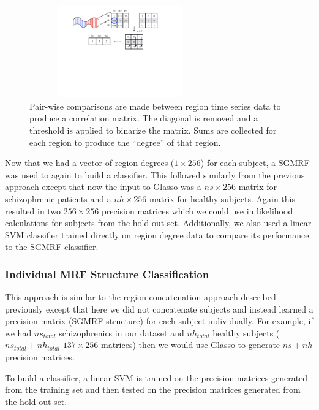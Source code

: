 \documentclass{article} %
\begin{document}
\begin{figure}[!htb]
  \centering
  \includegraphics[width=0.7\textwidth, height=4.0cm]{diagrams/ROI_deg_img.pdf}
  \caption{Pair-wise comparisons are made between region time series data to
  produce a correlation matrix. The diagonal is removed and a threshold is
  applied to binarize the matrix. Sums are collected for each region to
  produce the ``degree'' of that region.}
  \label{fig:degree_calc}
\end{figure}

Now that we had a vector of region degrees ($1 \times 256$) for each subject,
a SGMRF was used to again to build a classifier. This followed similarly from
the previous approach except that now the input to Glasso was a $ns \times 256$
matrix for schizophrenic patients and a $nh \times256$ matrix for healthy
subjects. Again this resulted in two $256 \times 256$ precision matrices which
we could use in likelihood calculations for subjects from the hold-out set.
Additionally, we also used a linear SVM classifier trained directly on
region degree data to compare its performance to the SGMRF classifier.


\subsubsection{Individual MRF Structure Classification}

This approach is similar to the region concatenation approach described 
previously except that here we did not concatenate subjects and instead
learned a precision matrix (SGMRF structure) for each subject 
individually. For example, if we had $ns_{total}$ schizophrenics in our 
dataset and $nh_{total}$ healthy subjects ($ns_{total} + nh_{total}$ 
$137 \times 256$ matrices) then we would use Glasso to generate $ns + nh$ 
precision matrices.

To build a classifier, a linear SVM is trained on the precision matrices 
generated from the training set and then tested on the precision matrices 
generated from the hold-out set.
\end{document}

